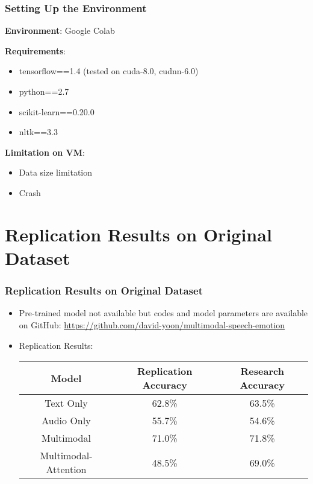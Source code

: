 \documentclass{beamer}
\begin{document}
\begin{frame}
\frametitle{Setting Up the Environment}
\textbf{Environment}: Google Colab

\textbf{Requirements}:
\begin{itemize}
    \item tensorflow==1.4 (tested on cuda-8.0, cudnn-6.0)
    \item python==2.7
    \item scikit-learn==0.20.0
    \item nltk==3.3
\end{itemize}

\textbf{Limitation on VM}:
\begin{itemize}
    \item Data size limitation
    \item Crash
\end{itemize}

\end{frame}


\section{Replication Results on Original Dataset}

\begin{frame}
\frametitle{Replication Results on Original Dataset}

    \begin{itemize}
        \item Pre-trained model not available but codes and model parameters are available on GitHub: \href{https://github.com/david-yoon/multimodal-speech-emotion}{https://github.com/david-yoon/multimodal-speech-emotion}
        
        \item Replication Results: \\
            \begin{center}
                \begin{tabular}{||c c c||} 
                 \hline
                 Model & Replication Accuracy & Research Accuracy \\ [0.5ex] 
                 \hline\hline
                 Text Only & 62.8\% & 63.5\%\\ 
                 \hline
                 Audio Only & 55.7\% & 54.6\%\\
                 \hline
                 Multimodal & 71.0\% & 71.8\%\\
                 \hline
                 Multimodal-Attention & 48.5\% & 69.0\%\\
                 \hline
                \end{tabular}
            \end{center}
    \end{itemize}

\end{frame}
\end{document}

